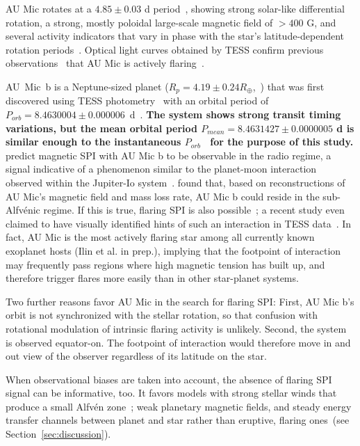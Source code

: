 \documentclass[fleqn,usenatbib]{mnras}%
\begin{document}
AU Mic rotates at a $4.85\pm0.03$ d period~\citep{gilbert2021flares}, showing strong solar-like differential rotation, a strong, mostly poloidal large-scale magnetic field of $>400$ G, and several activity indicators that vary in phase with the star's latitude-dependent rotation periods~\citep{klein2021}. Optical light curves obtained by TESS confirm previous observations~\citep{katsova1999, robinson2001, redfield2002} that AU Mic is actively flaring~\citep{martioli2021new}.

\mbox{AU Mic b} is a Neptune-sized planet (\mbox{$R_p = 4.19\pm0.24R_\oplus$},~\citealt{gilbert2021flares}) that was first discovered using TESS photometry~\citep{plavchan2020} with an orbital period of \mbox{$P_{orb}=8.4630004\pm0.000006$ d}~\citep{gilbert2021flares}. \textbf{The system shows strong transit timing variations, but the mean orbital period $P_{mean} = 8.4631427 \pm 0.0000005$ d is similar enough to the instantaneous $P_{orb}$~\citep{szabo2022transit} for the purpose of this study.}
\citet{kavanagh2021} predict magnetic SPI with AU Mic b to be observable in the radio regime, a signal indicative of a phenomenon similar to the planet-moon interaction observed within the Jupiter-Io system~\citep{saur2013magnetic}. \citet{kavanagh2021} found that, based on reconstructions of AU Mic's magnetic field and mass loss rate, AU Mic b could reside in the sub-Alfv\'enic regime. If this is true, flaring SPI is also possible~\citep{lanza2018close-by}; a recent study even claimed to have visually identified hints of such an interaction in TESS data~\citep{colombo2022short}. In fact, AU Mic is the most actively flaring star among all currently known exoplanet hosts (Ilin et al. in prep.), implying that the footpoint of interaction may frequently pass regions where high magnetic tension has built up, and therefore trigger flares more easily than in other star-planet systems. 

Two further reasons favor AU Mic in the search for flaring SPI: First, AU Mic b's orbit is not synchronized with the stellar rotation, so that confusion with rotational modulation of intrinsic flaring activity is unlikely. Second, the system is observed equator-on. The footpoint of interaction would therefore move in and out view of the observer regardless of its latitude on the star.

When observational biases are taken into account, the absence of flaring SPI signal can be informative, too. It favors models with strong stellar winds that produce a small Alfv\'en zone~\citep{kavanagh2021}; weak planetary magnetic fields, and steady energy transfer channels between planet and star rather than eruptive, flaring ones~(see Section~\ref{sec:discussion}).  
\end{document}
